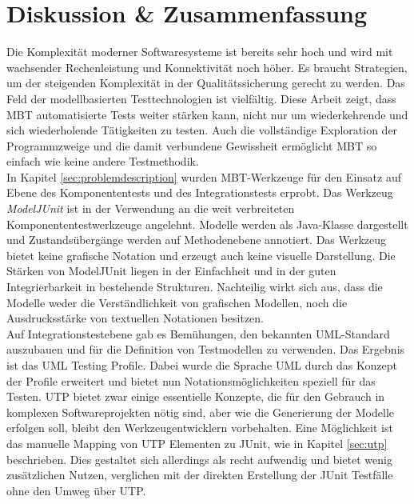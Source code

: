\makeatletter\ifthesis@masterthesis
\chapter{Diskussion \& Zusammenfassung}
\label{sec:discussion}
\label{sec:conclusion}
Die Komplexität moderner Softwaresysteme ist bereits sehr hoch und wird mit wachsender Rechenleistung und Konnektivität noch höher. Es braucht Strategien, um der steigenden Komplexität in der Qualitätssicherung gerecht zu werden. Das Feld der modellbasierten Testtechnologien ist vielfältig. Diese Arbeit zeigt, dass \Gls{MBT} automatisierte Tests weiter stärken kann, nicht nur um wiederkehrende und sich wiederholende Tätigkeiten zu testen. Auch die vollständige Exploration der Programmzweige und die damit verbundene Gewissheit ermöglicht \Gls{MBT} so einfach wie keine andere Testmethodik.\\
In Kapitel \ref{sec:problemdescription}  wurden \Gls{MBT}-Werkzeuge für den Einsatz auf Ebene des Komponententests und des Integrationstests erprobt. Das Werkzeug \textit{ModelJUnit} ist in der Verwendung an die weit verbreiteten Komponententestwerkzeuge angelehnt. Modelle werden als Java-Klasse dargestellt und Zustandsübergänge werden auf Methodenebene annotiert. Das Werkzeug bietet keine grafische Notation und erzeugt auch keine visuelle Darstellung. Die Stärken von ModelJUnit liegen in der Einfachheit und in der guten Integrierbarkeit in bestehende Strukturen. Nachteilig wirkt sich aus, dass die Modelle weder die Verständlichkeit von grafischen Modellen, noch die Ausdrucksstärke von textuellen Notationen besitzen.\\
Auf Integrationstestebene gab es Bemühungen, den bekannten UML-Standard auszubauen und für die Definition von Testmodellen zu verwenden. Das Ergebnis ist das UML Testing Profile. Dabei wurde die Sprache UML durch das Konzept der Profile erweitert und bietet nun Notationsmöglichkeiten speziell für das Testen. \Gls{UTP} bietet zwar einige essentielle Konzepte, die für den Gebrauch in komplexen Softwareprojekten nötig sind, aber wie die Generierung der Modelle erfolgen soll, bleibt den Werkzeugentwicklern vorbehalten. Eine Möglichkeit ist das manuelle Mapping von \Gls{UTP} Elementen zu JUnit, wie in Kapitel \ref{sec:utp} beschrieben. Dies gestaltet sich allerdings als recht aufwendig und bietet wenig zusätzlichen Nutzen, verglichen mit der direkten Erstellung der JUnit Testfälle ohne den Umweg über \Gls{UTP}.\\
